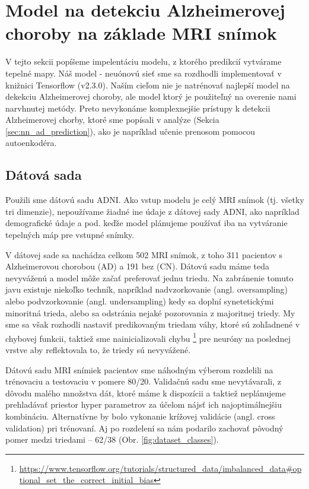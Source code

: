 \section{Model na detekciu Alzheimerovej choroby na základe MRI snímok}

V tejto sekcii popíšeme impelentáciu modelu, z ktorého predikcií vytvárame tepelné mapy. Náš model - neuónovú sieť sme sa rozdhodli implementovať v knižnici Tensorflow (v2.3.0). Naším cieľom nie je natrénovať najlepší model na dekekciu Alzheimerovej choroby, ale model ktorý je použiteľný na overenie nami narvhnutej metódy. Preto nevykonáme komplexnejšie prístupy k detekcii Alzheimerovej chorby, ktoré sme popísali v analýze (Sekcia \ref{sec:nn_ad_prediction}), ako je napríklad učenie prenosom pomocou autoenkodéra.

\subsection{Dátová sada}

Použili sme dátovú sadu ADNI. Ako vstup modelu je celý MRI snímok (tj. všetky tri dimenzie), nepoužívame žiadné ine údaje z dátovej sady ADNI, ako napríklad demografické údaje a pod. keďže model plánujeme používať iba na vytváranie tepelných máp pre vstupné snímky. 

V dátovej sade sa nachádza celkom 502 MRI snímok, z toho 311 pacientov s Alzheimerovou chorobou (AD) a 191 bez (CN). Dátovú sadu máme teda nevyváženú a model môže začať preferovať jednu triedu. Na zabránenie tomuto javu existuje niekoľko techník, napríklad nadvzorkovanie (angl. oversampling) alebo podvzorkovanie (angl. undersampling) kedy sa doplní synetetickými minoritná trieda, alebo sa odstránia nejaké pozorovania z majoritnej triedy. My sme sa však rozhodli nastaviť predikovaným triedam váhy, ktoré sú zohľadnené v chybovej funkcii, taktiež sme nainicializovali chybu \footnote{\url{https://www.tensorflow.org/tutorials/structured\_data/imbalanced\_data\#optional\_set\_the\_correct\_initial\_bias}} pre neuróny na poslednej vrstve aby reflektovala to, že triedy sú nevyvážené.

Dátovú sadu MRI snímiek pacientov sme náhodným výberom rozdelili na trénovaciu a testovaciu v pomere 80/20. Validačnú sadu sme nevytávarali, z dôvodu malého množstva dát, ktoré máme k dispozícii a taktiež neplánujeme prehladávať priestor hyper parametrov za účelom nájsť ich najoptimálnejšiu kombináciu. Alternatívne by bolo vykonanie krížovej validácie (angl. cross validation) pri trénovaní. Aj po rozdelení sa nám podarilo zachovať pôvodný pomer medzi triedami -- 62/38 (Obr. \ref{fig:dataset_classes}).

